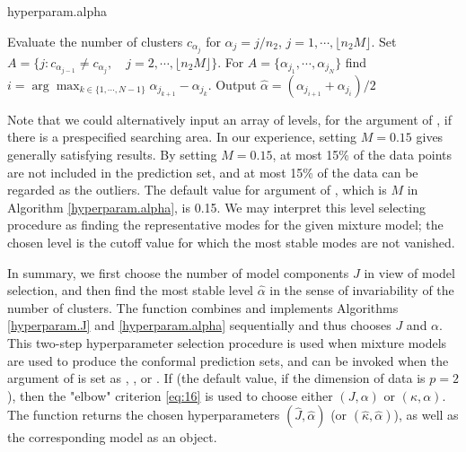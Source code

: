 \begin{algorithm}
\caption{hyperparam.alpha}\label{hyperparam.alpha}
\begin{algorithmic}[1]
  \State Evaluate the number of clusters $c_{\alpha_j}$ for $\alpha_j = j/n_{2}$,  $j=1,\cdots,\lfloor n_{2} M\rfloor$.
  \State %
  Set $A = \{j: c_{\alpha_{j-1}}\ne c_{\alpha_j},\quad j=2,\cdots,\lfloor n_{2}M\rfloor\}$.
  \State For $A=\{\alpha_{j_1},\cdots,\alpha_{j_N}\}$ find $i=\arg\max_{k\in\{1,\cdots, N-1\}}\alpha_{j_{k+1}} - \alpha_{j_k}$.
  \State Output $\hat{\alpha} = \left(\alpha_{j_{i+1}} + \alpha_{j_i}\right)/2$
\EndProcedure
\end{algorithmic}
\end{algorithm}
Note that we could alternatively input an array of levels, for the argument  of , if there is a prespecified searching area.
In our experience, setting $M = 0.15$ gives generally satisfying results. By setting $M = 0.15$, at most 15\% of the data points are not included in the prediction set, and at most 15\% of the data can be regarded as the outliers. The default value for argument  of , which is $M$ in Algorithm \ref{hyperparam.alpha}, is 0.15. We may interpret this level selecting procedure as finding the representative modes for the given mixture model; the chosen level is the cutoff value for which the most stable modes are not vanished. 

In summary, we first choose the number of model components $J$ in view of model selection, and then find the most stable level $\hat{\alpha}$ in the sense of invariability of the number of clusters. The function  combines and implements Algorithms \ref{hyperparam.J} and \ref{hyperparam.alpha} sequentially and thus chooses $J$ and $\alpha$. This two-step hyperparameter selection procedure is used when mixture models are used to produce the conformal prediction sets, and can be invoked when the argument  of  is set as , , or . 
If  (the default value, if the dimension of data is $p  = 2$), then the "elbow" criterion \eqref{eq:16} is used to choose either $(J, \alpha)$ or $(\kappa, \alpha)$. %
%
The function  returns the chosen hyperparameters $(\hat{J}, \hat\alpha)$ (or $(\hat\kappa, \hat\alpha)$), as well as the corresponding model as an  object. 

